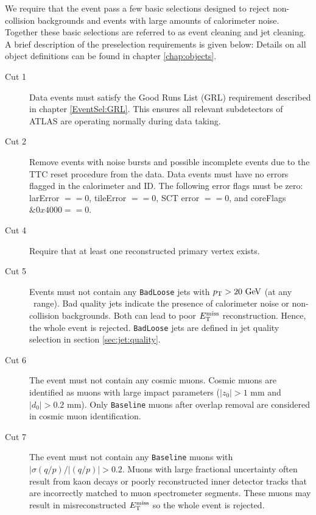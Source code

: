\indent We require that the event pass a few basic selections designed to reject non-collision backgrounds and events with large amounts of calorimeter noise.  Together these basic selections are referred to as event cleaning and jet cleaning.  \\ %

\indent A brief description of the preselection requirements is given below: Details on all object definitions can be found in chapter \ref{chap:objects}. \\

\begin{description}
\item[Cut 1] Data events must satisfy the Good Runs List (GRL) requirement described in chapter \ref{EventSel:GRL}.  This ensures all relevant subdetectors of ATLAS are operating normally during data taking. 
\item[Cut 2] Remove events with noise bursts and possible incomplete events due to the TTC reset procedure from the data. Data events must have no errors flagged in the calorimeter and ID.  The following error flags must be zero: larError $== 0$, tileError $== 0$, SCT error $==0$, and coreFlags $\&0x4000 == 0$.
\item[Cut 4] Require that at least one reconstructed primary vertex exists.
\item[Cut 5] Events must not contain any {\tt BadLoose} jets with $\pT > 20 \gev$ (at any \eta\ range). Bad quality jets indicate the presence of calorimeter noise or non-collision backgrounds. Both can lead to poor $E_{\mathrm{T}}^{\mathrm{miss}}$ reconstruction. Hence, the whole event is rejected.  {\tt BadLoose} jets are defined in jet quality selection in section \ref{sec:jet:quality}.  
\item[Cut 6] The event must not contain any cosmic muons.  Cosmic muons are identified as muons with large impact parameters  ($|z_0| > 1$ mm and $|d_0| > 0.2$ mm).  Only {\tt Baseline} muons after overlap removal are considered in cosmic muon identification.
\item[Cut 7] The event must not contain any {\tt Baseline} muons with $|\sigma(q/p)/|(q/p)| > 0.2$.  Muons with large fractional uncertainty often result from kaon decays or poorly reconstructed inner detector tracks that are incorrectly matched to muon spectrometer segments. These muons may result in misreconstructed $E_{\mathrm{T}}^{\mathrm{miss}}$ so the whole event is rejected.
\end{description}

